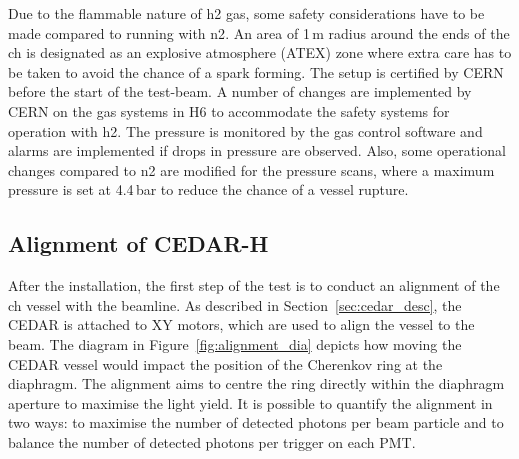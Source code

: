 \documentclass[../../main.tex]{subfiles}
\begin{document}
    Due to the flammable nature of \gls{h2} gas, some safety considerations have to be made compared to running with \gls{n2}. An area of 1\,m radius around the ends of the \gls{ch} is designated as an explosive atmosphere (ATEX) zone where extra care has to be taken to avoid the chance of a spark forming. The setup is certified by CERN before the start of the test-beam. A number of changes are implemented by CERN on the gas systems in H6 to accommodate the safety systems for operation with \gls{h2}. 
    The pressure is monitored by the gas control software and alarms are implemented if drops in pressure are observed. Also, some operational changes compared to \gls{n2} are modified for the pressure scans, where a maximum pressure is set at 4.4\,bar to reduce the chance of a vessel rupture.
    \subsection{Alignment of CEDAR-H}
    After the installation, the first step of the test is to conduct an alignment of the \gls{ch} vessel with the beamline. As described in Section~\ref{sec:cedar_desc}, the \gls{CEDAR} is attached to XY motors, which are used to align the vessel to the beam. The diagram in Figure~\ref{fig:alignment_dia}
    depicts how moving the \gls{CEDAR} vessel would impact the position of the Cherenkov ring at the diaphragm. The alignment aims to centre the ring directly within the diaphragm aperture to maximise the light yield. 
    It is possible to quantify the alignment in two ways: to maximise the number of detected photons per beam particle and to balance the number of detected photons per trigger on each \gls{PMT}.
    
\end{document}
